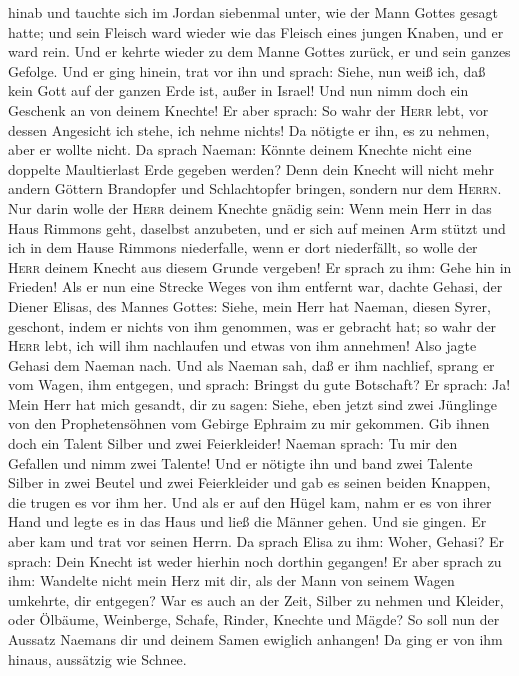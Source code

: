 hinab und tauchte sich im Jordan siebenmal unter, wie der Mann Gottes
gesagt hatte; und sein Fleisch ward wieder wie das Fleisch eines jungen
Knaben, und er ward rein.  Und er kehrte wieder zu dem
Manne Gottes zurück, er und sein ganzes Gefolge. Und er ging hinein,
trat vor ihn und sprach: Siehe, nun weiß ich, daß kein Gott auf der
ganzen Erde ist, außer in Israel! Und nun nimm doch ein Geschenk an von
deinem Knechte!  Er aber sprach: So wahr der
\textsc{Herr} lebt, vor dessen Angesicht ich stehe, ich nehme nichts! Da
nötigte er ihn, es zu nehmen, aber er wollte nicht.  Da
sprach Naeman: Könnte deinem Knechte nicht eine doppelte Maultierlast
Erde gegeben werden? Denn dein Knecht will nicht mehr andern Göttern
Brandopfer und Schlachtopfer bringen, sondern nur dem \textsc{Herrn}.
 Nur darin wolle der \textsc{Herr} deinem Knechte gnädig
sein: Wenn mein Herr in das Haus Rimmons geht, daselbst anzubeten, und
er sich auf meinen Arm stützt und ich in dem Hause Rimmons niederfalle,
wenn er dort niederfällt, so wolle der \textsc{Herr} deinem Knecht aus
diesem Grunde vergeben!  Er sprach zu ihm: Gehe hin in
Frieden!  Als er nun eine Strecke Weges von ihm entfernt
war, dachte Gehasi, der Diener Elisas, des Mannes Gottes: Siehe, mein
Herr hat Naeman, diesen Syrer, geschont, indem er nichts von ihm
genommen, was er gebracht hat; so wahr der \textsc{Herr} lebt, ich will
ihm nachlaufen und etwas von ihm annehmen!  Also jagte
Gehasi dem Naeman nach. Und als Naeman sah, daß er ihm nachlief, sprang
er vom Wagen, ihm entgegen, und sprach:  Bringst du gute
Botschaft? Er sprach: Ja! Mein Herr hat mich gesandt, dir zu sagen:
Siehe, eben jetzt sind zwei Jünglinge von den Prophetensöhnen vom
Gebirge Ephraim zu mir gekommen. Gib ihnen doch ein Talent Silber und
zwei Feierkleider!  Naeman sprach: Tu mir den Gefallen
und nimm zwei Talente! Und er nötigte ihn und band zwei Talente Silber
in zwei Beutel und zwei Feierkleider und gab es seinen beiden Knappen,
die trugen es vor ihm her.  Und als er auf den Hügel kam,
nahm er es von ihrer Hand und legte es in das Haus und ließ die Männer
gehen.  Und sie gingen. Er aber kam und trat vor seinen
Herrn. Da sprach Elisa zu ihm: Woher, Gehasi? Er sprach: Dein Knecht ist
weder hierhin noch dorthin gegangen!  Er aber sprach zu
ihm: Wandelte nicht mein Herz mit dir, als der Mann von seinem Wagen
umkehrte, dir entgegen? War es auch an der Zeit, Silber zu nehmen und
Kleider, oder Ölbäume, Weinberge, Schafe, Rinder, Knechte und Mägde?
 So soll nun der Aussatz Naemans dir und deinem Samen
ewiglich anhangen! Da ging er von ihm hinaus, aussätzig wie Schnee.

